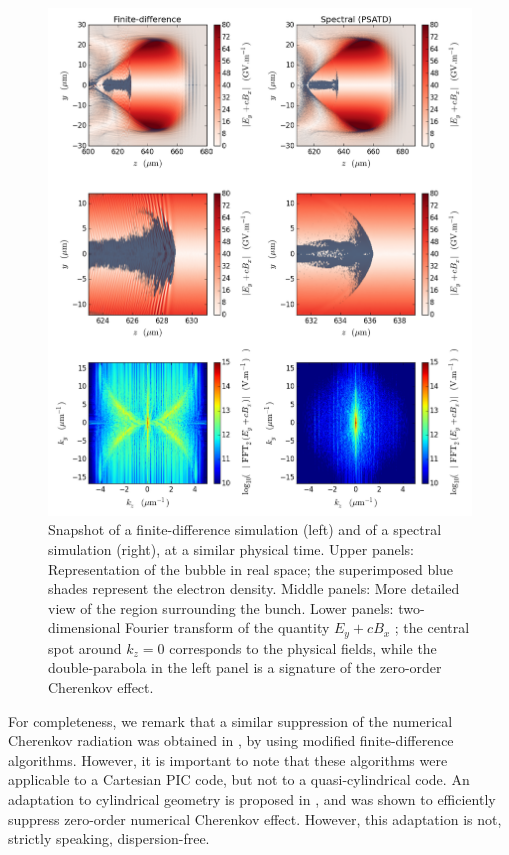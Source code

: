 \documentclass[1p,times]{elsarticle}
\begin{document}
\begin{figure}[!h]
\centering
\includegraphics[width=\textwidth]{Cherenkov.png}
\caption{\label{fig:Cherenkov}Snapshot of a finite-difference
  simulation (left) and of a spectral simulation (right), at a similar
  physical time. Upper panels: Representation of the bubble in real space; 
the superimposed blue shades represent the electron
  density. Middle panels: More detailed view of the region surrounding the
  bunch. Lower panels: two-dimensional Fourier transform of the
  quantity $E_y + cB_x$ ; the central spot around $k_z=0$ corresponds
  to the physical fields, while the double-parabola in the left panel
  is a signature of the zero-order Cherenkov effect.}
\end{figure}

For completeness, we remark that a similar suppression of the
numerical Cherenkov radiation was 
obtained in \cite{LehePRSTAB2013,CowanPRSTAB2013}, by using 
modified finite-difference algorithms. However, it is important to
note that these algorithms were applicable to a Cartesian PIC code,
but not to a quasi-cylindrical code. An adaptation to
cylindrical geometry is proposed in \cite{LeheThesis}, and was 
shown to efficiently suppress zero-order numerical Cherenkov effect. However, this
adaptation is not, strictly speaking, dispersion-free. 
\end{document}
